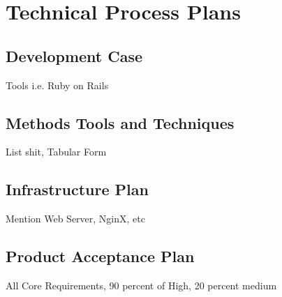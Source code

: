
\chapter{Technical Process Plans} %

\label{Part6Chapter5} %



\section{Development Case}

Tools i.e. Ruby on Rails


\section{Methods Tools and Techniques}

List shit, Tabular Form


\section{Infrastructure Plan}

Mention Web Server, NginX, etc


\section{Product Acceptance Plan}

All Core Requirements, 90 percent of High, 20 percent medium




